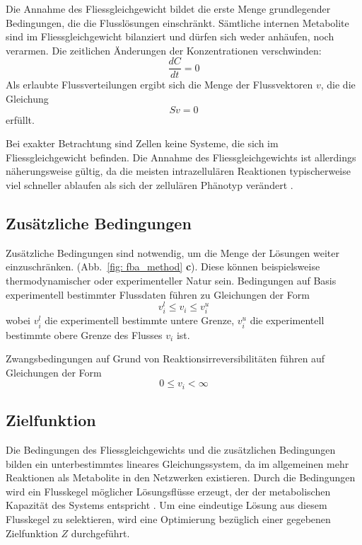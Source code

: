 Die Annahme des Fliessgleichgewicht bildet die erste Menge grundlegender Bedingungen, die die Flusslösungen einschränkt. Sämtliche internen Metabolite sind im Fliessgleichgewicht bilanziert und dürfen sich weder anhäufen, noch verarmen. Die zeitlichen Änderungen der Konzentrationen verschwinden:
\begin{equation}
 \frac{dC}{dt} = 0
\end{equation}
Als erlaubte Flussverteilungen ergibt sich die Menge der Flussvektoren $v$, die die Gleichung 
\begin{equation}
 Sv = 0
\end{equation}
erfüllt.

Bei exakter Betrachtung sind Zellen keine Systeme, die sich im Fliessgleichgewicht befinden.
Die Annahme des Fliessgleichgewichts ist allerdings näherungsweise gültig, da die meisten intrazellulären Reaktionen typischerweise viel schneller ablaufen als sich der zellulären Phänotyp verändert \cite{Lee2006}.

\subsection{Zusätzliche Bedingungen}
 Zusätzliche Bedingungen sind notwendig, um die Menge der Lösungen weiter einzuschränken. (Abb.~\ref{fig: fba_method} \textbf{c}). Diese können beispielsweise thermodynamischer oder experimenteller Natur sein. Bedingungen auf Basis experimentell bestimmter Flussdaten führen zu Gleichungen der Form
\begin{equation}
 v_i^{l} \leq v_i \leq v_i^{u}
\end{equation}
wobei $v_i^{l}$ die experimentell bestimmte untere Grenze, $v_i^{u}$ die experimentell bestimmte obere Grenze des Flusses $v_i$ ist.

Zwangsbedingungen auf Grund von Reaktionsirreversibilitäten führen auf Gleichungen der Form
\begin{equation}
0 \leq v_i < \infty 
\label{eqn:irreversibel}
\end{equation}

\subsection{Zielfunktion}
Die Bedingungen des Fliessgleichgewichts und die zusätzlichen Bedingungen bilden ein unterbestimmtes lineares Gleichungssystem, da im allgemeinen mehr Reaktionen als Metabolite in den Netzwerken existieren. Durch die Bedingungen wird ein Flusskegel möglicher Lösungsflüsse erzeugt, der der metabolischen Kapazität des Systems entspricht \cite{Schilling2000, Papin2002}. Um eine eindeutige Lösung aus diesem Flusskegel zu selektieren, wird eine Optimierung bezüglich einer gegebenen Zielfunktion $Z$ durchgeführt.

